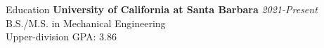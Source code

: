 \documentclass[
	11pt, %
]{resume} %
\begin{document}
\begin{rSection}{Education}	
	\textbf{University of California at Santa Barbara} \hfill \textit{2021-Present} \\ 
	B.S./M.S. in Mechanical Engineering \\
	Upper-division GPA: 3.86 \\
\end{rSection}

\end{document}
